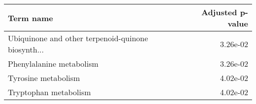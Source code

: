 \begin{tabular}{lr}
\toprule
                                         Term name &  Adjusted p-value \\
\midrule
Ubiquinone and other terpenoid-quinone biosynth... &          3.26e-02 \\
                          Phenylalanine metabolism &          3.26e-02 \\
                               Tyrosine metabolism &          4.02e-02 \\
                             Tryptophan metabolism &          4.02e-02 \\
\bottomrule
\end{tabular}
